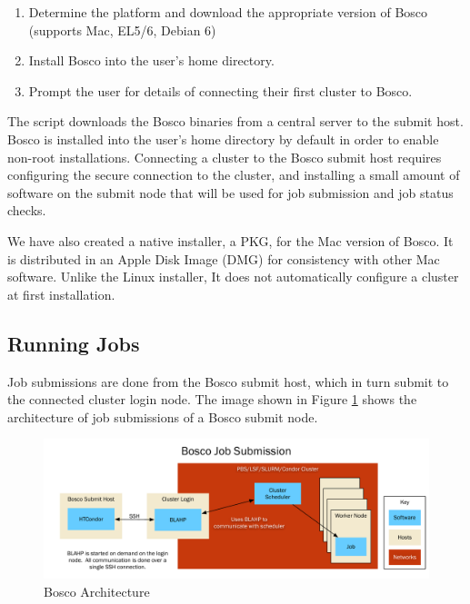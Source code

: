 \begin{enumerate}
\item Determine the platform and download the appropriate version of Bosco (supports Mac, EL5/6, Debian 6)
\item Install Bosco into the user's home directory.
\item Prompt the user for details of connecting their first cluster to Bosco.
\end{enumerate}

The script downloads the Bosco binaries from a central server to the submit host.  Bosco is installed into the user's home directory by default in order to enable non-root installations.  Connecting a cluster to the Bosco submit host requires configuring the secure connection to the cluster, and installing a small amount of software on the submit node that will be used for job submission and job status checks.

We have also created a native installer, a PKG, for the Mac version of Bosco.  It is distributed in an Apple Disk Image (DMG) for consistency with other Mac software.  Unlike the Linux installer, It does not automatically configure a cluster at first installation.


\subsection{Running Jobs}

Job submissions are done from the Bosco submit host, which in turn submit to the connected cluster login node.  The image shown in Figure \ref{fig:archgraph1} shows the architecture of job submissions of a Bosco submit node.

\begin{figure}[ht!]
\includegraphics[width=\textwidth]{images/ArchitectureGraph1}
\caption{Bosco Architecture}
\label{fig:archgraph1}
\end{figure}

